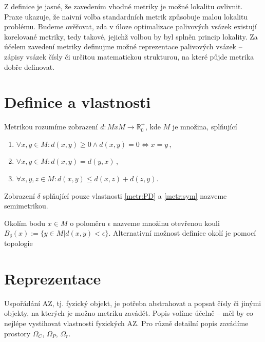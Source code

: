 Z definice je jasné, že zavedením vhodné metriky je možné lokalitu ovlivnit. Praxe ukazuje, že naivní volba standardních metrik způsobuje malou lokalitu problému. Budeme ověřovat, zda v úloze optimalizace palivových vsázek existují korelované metriky, tedy takové, jejichž volbou by byl splněn princip lokality. Za účelem zavedení metriky definujme možné reprezentace palivových vsázek -- zápisy vsázek čísly či určitou matematickou strukturou, na které půjde metrika dobře definovat.




\section{Definice a vlastnosti}
Metrikou rozumíme zobrazení $d: MxM \rightarrow \mathbb{R}_{0}^{+}$, kde $M$ je množina, 
splňující
\begin{enumerate}
    \item \label{metr:PD} $\forall x,y \in M: d(x,y) \geq 0 \wedge d(x,y) = 0 \Leftrightarrow x=y$\,,
    \item \label{metr:sym} $\forall x,y \in M: d(x,y) = d(y,x)$\,,
    \item \label{metr:tri}$\forall x,y,z \in M: d(x,y) \leq d(x,z) + d(z,y)$.
\end{enumerate}
Zobrazení $\delta$ splňující pouze vlastnosti \eqref{metr:PD} a \eqref{metr:sym} nazveme semimetrikou.

Okolím bodu $x \in M$ o poloměru $\epsilon$ nazveme množinu otevřenou kouli $B_{\delta}(x):=\{y\in M | d(x,y)< \epsilon \}$. 
Alternativní možnost definice okolí je pomocí topologie



\section{Reprezentace}
Uspořádání AZ, tj. fyzický objekt, je potřeba abstrahovat a popsat čísly či jinými objekty, na kterých je možno metriku zavádět. 
Popis volíme účelně -- měl by co nejlépe vystihovat vlastnosti fyzických AZ. Pro různě detailní popis zavádíme prostory $\Omega_C$, 
$\Omega_P$, $\Omega_r$.

